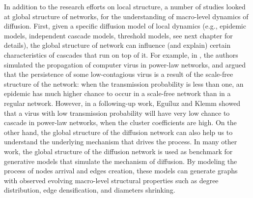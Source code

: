 \documentclass[phd,tocprelim]{cornell}
\begin{document}
In addition to the research efforts on local structure, a number of studies looked at global structure of networks, for the understanding of macro-level dynamics of diffusion. First, given a specific diffusion model of local dynamics (e.g., epidemic models, independent cascade models, threshold models, see next chapter for details), the global structure of network can influence (and explain) certain characteristics of cascades that run on top of it. For example,
in \cite{pastor-satorras01}, the authors simulated the propagation of computer
virus in power-law networks, and argued that the persistence of some low-contagious
virus is a result of the scale-free structure of the network: when the transmission probability is less than one, an epidemic has much higher chance to occur in a scale-free network than in a regular network. 
However, in a following-up work\cite{Eguiluz-2002}, Egu\'{i}luz and Klemm showed that a virus with low transmission probability will have very low chance to cascade in power-law networks, when the cluster coefficients are high. On the other hand, the global structure of the diffusion network can also help us to understand the underlying mechanism that drives the process.
In many other work, the global structure of the diffusion network is used as benchmark for generative models that simulate the mechanism of diffusion\cite{Eguiluz-2002,Gruhl-2004,Nowell-2008}. By modeling the process of nodes arrival and edges creation, these models can generate graphs with observed evolving macro-level structural properties such as degree distribution, edge densification, and diameters shrinking.

\end{document}

